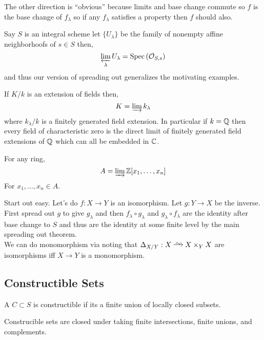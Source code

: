 \documentclass[12pt]{article}
\begin{document}
\begin{rmk}
The other direction is ``obvious'' because limits and base change commute so $f$ is the base change of $f_{\lambda}$ so if any $f_{\lambda}$ satisfies a property then $f$ should also.
\end{rmk}

\begin{example}
Say $S$ is an integral scheme let $\{ U_\lambda \}$ be the family of nonempty affine neighborhoofs of $s \in S$ then,
\[ \varprojlim_{\lambda} U_\lambda = \mathrm{Spec}\left( \mathcal{O}_{S, s} \right) \]
and thus our version of spreading out generalizes the motivating examples.
\end{example}

\begin{example}
If $K/k$ is an extension of fields then,
\[ K = \varinjlim k_\lambda \]
where $k_\lambda / k$ is a finitely generated field extension. In particular if $k = \mathbb{Q}$ then every field of characteristic zero is the direct limit of finitely generated field extensions of $\mathbb{Q}$ which can all be embedded in $\mathbb{C}$.
\end{example}

\begin{example}
For any ring,
\[ A = \varinjlim \mathbb{Z}[x_1, \dots, x_n] \]
For $x_1, \dots, x_n \in A$.
\end{example}

\begin{example}
Start out easy. Let's do $f : X \to Y$ is an isomorphism. Let $g : Y \to X$ be the inverse. First spread out $g$ to give $g_\lambda$ and then $f_\lambda \circ g_\lambda$ and $g_\lambda \circ f_\lambda$ are the identity after base change to $S$ and thus are the identity at some finite level by the main spreading out theorem.
\bigskip\\
We can do monomorphism via noting that $\Delta_{X/Y} : X \iso X \times_Y X$ are isomorphisms iff $X \to Y$ is a monomorphism.
\end{example}

\subsection{Constructible Sets}

\begin{defn}
A $C \subset S$ is constructible if its a finite union of locally closed subsets.
\end{defn}

\begin{prop}
Construcible sets are closed under taking finite intersections, finite unions, and complements.
\end{prop}
\end{document}
